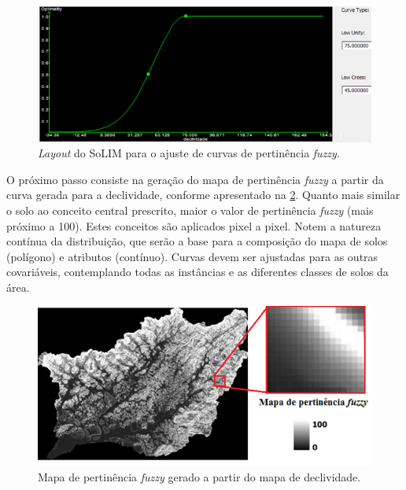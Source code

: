\begin{figure}[tb!]
\begin{minipage}[t]{1\linewidth}
\begin{center}
 \includegraphics[width=\textwidth]{figuras/figura1.png}
 \caption{\emph{Layout} do SoLIM para o ajuste de curvas de pertinência \emph{fuzzy}.}
 \label{fig:figura1}
\end{center}
\end{minipage}
\end{figure}
O próximo passo consiste na geração do mapa de pertinência \emph{fuzzy} a partir da curva gerada para a declividade, conforme apresentado na \ref{fig:figura2}. Quanto mais similar o solo ao conceito central prescrito, maior o valor de pertinência \emph{fuzzy} (mais próximo a 100). Estes conceitos são aplicados pixel a pixel. Notem a natureza contínua da distribuição, que serão a base para a composição do mapa de solos (polígono) e atributos (contínuo). Curvas devem ser ajustadas para as outras covariáveis, contemplando todas as instâncias e as diferentes classes de solos da área.\\
\begin{figure}[tb!]
\begin{minipage}[t]{1\linewidth}
\begin{center}
   \includegraphics[width=\textwidth]{figuras/figura2.png}
   \caption{Mapa de pertinência \emph{fuzzy} gerado a partir do mapa de declividade.}
   \label{fig:figura2}
\end{center}
\end{minipage}
\end{figure}
